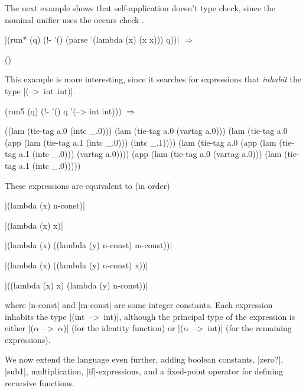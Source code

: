 The next example shows that self-application doesn't type check, since the nominal unifier 
uses the occurs check \cite{lloyd:lp}.

\wspace

\noindent\scheme|(run* (q) (!- '() (parse '(lambda (x) (x x))) q))| $\Rightarrow$ \begin{schemeresponsebox}()\end{schemeresponsebox}

\wspace

This example is more interesting, since it searches for expressions
that \emph{inhabit} the type \mbox{\schemeresult|(--> int int)|}.

\schemedisplayspace
\begin{schemedisplay}
(run5 (q) (!- '() q '(--> int int))) $\Rightarrow$
\end{schemedisplay}
\nspace
\begin{schemeresponse}
((lam (tie-tag a.0 (intc _.0)))
 (lam (tie-tag a.0 (vartag a.0)))
 (lam (tie-tag a.0 (app (lam (tie-tag a.1 (intc _.0))) (intc _.1))))
 (lam (tie-tag a.0 (app (lam (tie-tag a.1 (intc _.0))) (vartag a.0))))
 (app (lam (tie-tag a.0 (vartag a.0))) (lam (tie-tag a.1 (intc _.0)))))
\end{schemeresponse}

\noindent These expressions are equivalent to (in order)

\enlargethispage{1em}

\wspace

\noindent\scheme|(lambda (x) n-const)|

\noindent\scheme|(lambda (x) x)|

\noindent\scheme|(lambda (x) ((lambda (y) n-const) m-const))|

\noindent\scheme|(lambda (x) ((lambda (y) n-const) x))|

\noindent\scheme|((lambda (x) x) (lambda (y) n-const))|

\wspace

\noindent where \scheme|n-const| and \scheme|m-const| are some integer constants.
Each expression inhabits the type \mbox{\schemeresult|(int --> int)|}, although the principal type
of the expression is either
\mbox{\schemeresult|($\alpha$ --> $\alpha$)|} (for the identity function) or
\mbox{\schemeresult|($\alpha$ --> int)|} (for the remaining expressions).

We now extend the language even further, adding boolean constants,
\scheme|zero?|, \scheme|sub1|, multiplication,
\scheme|if|-expressions, and a fixed-point operator for defining
recursive functions.


